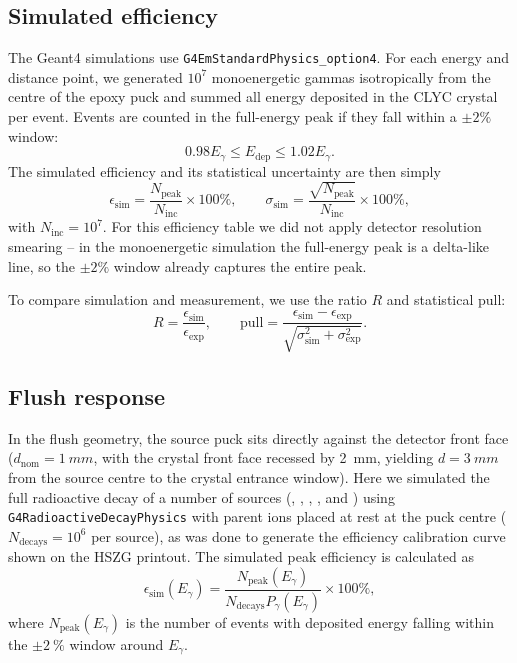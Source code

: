 \documentclass[11pt,a4paper]{article}
\begin{document}
\subsection{Simulated efficiency}
The Geant4 simulations use \texttt{G4EmStandardPhysics\_option4}. For each energy and distance point, we generated $10^7$ monoenergetic gammas isotropically from the centre of the epoxy puck and summed all energy deposited in the CLYC crystal per event. Events are counted in the full-energy peak if they fall within a $\pm2\%$ window:
\begin{equation}
  0.98E_\gamma\le E_{\mathrm{dep}}\le1.02E_\gamma.
  \label{eq:sim-window}
\end{equation}
The simulated efficiency and its statistical uncertainty are then simply
\begin{equation}
  \epsilon_{\mathrm{sim}}=\frac{N_{\mathrm{peak}}}{N_{\mathrm{inc}}}\times100\%,
  \qquad
  \sigma_{\mathrm{sim}}=\frac{\sqrt{N_{\mathrm{peak}}}}{N_{\mathrm{inc}}}\times100\%,
  \label{eq:eff-sim}
\end{equation}
with $N_{\mathrm{inc}}=10^7$. For this efficiency table we did not apply detector resolution smearing -- in the monoenergetic simulation the full-energy peak is a delta-like line, so the $\pm2\%$ window already captures the entire peak.

To compare simulation and measurement, we use the ratio $R$ and statistical pull:
\begin{equation}
  R=\frac{\epsilon_{\mathrm{sim}}}{\epsilon_{\mathrm{exp}}},
  \qquad
  \mathrm{pull}=\frac{\epsilon_{\mathrm{sim}}-\epsilon_{\mathrm{exp}}}
  {\sqrt{\sigma_{\mathrm{sim}}^2+\sigma_{\mathrm{exp}}^2}}.
  \label{eq:ratio-pull}
\end{equation}

\subsection{Flush response}
In the flush geometry, the source puck sits directly against the detector front face ($d_{\mathrm{nom}}=\SI{1}{mm}$, with the crystal front face recessed by \SI{2}{mm}, yielding $d=\SI{3}{mm}$ from the source centre to the crystal entrance window). Here we simulated the full radioactive decay of a number of sources (, , , , and ) using \texttt{G4RadioactiveDecayPhysics} with parent ions placed at rest at the puck centre ($N_{\mathrm{decays}}=10^6$ per source), as was done to generate the efficiency calibration curve shown on the HSZG printout.
The simulated peak efficiency is calculated as
\begin{equation}
  \epsilon_{\mathrm{sim}}(E_\gamma)=
  \frac{N_{\mathrm{peak}}(E_\gamma)}{N_{\mathrm{decays}}P_\gamma(E_\gamma)}
  \times100\%,
  \label{eq:flush-eff}
\end{equation}
where $N_{\mathrm{peak}}(E_\gamma)$ is the number of events with deposited energy falling within the $\pm\SI{2}{\percent}$ window around $E_\gamma$.
\end{document}

